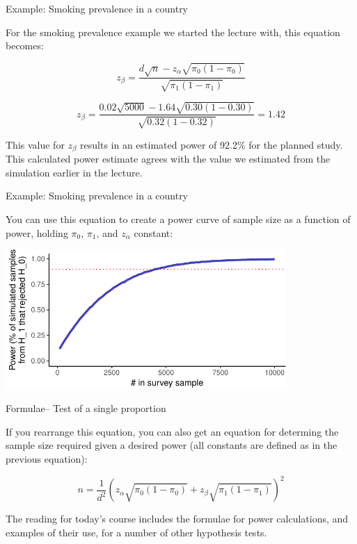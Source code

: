 \documentclass[ignorenonframetext,]{beamer}
\begin{document}
\begin{frame}{Example: Smoking prevalence in a country}

For the smoking prevalence example we started the lecture with, this
equation becomes:

\[
z_{\beta} = \frac{d\sqrt{n}-z_{\alpha}\sqrt{\pi_0(1-\pi_0)}}{\sqrt{\pi_1(1 - \pi_1)}}
\]

\[
z_{\beta} = \frac{0.02\sqrt{5000}-1.64\sqrt{0.30(1-0.30)}}{\sqrt{0.32(1 - 0.32)}} = 1.42
\]

This value for \(z_{\beta}\) results in an estimated power of 92.2\% for
the planned study. This calculated power estimate agrees with the value
we estimated from the simulation earlier in the lecture.

\end{frame}

\begin{frame}{Example: Smoking prevalence in a country}

You can use this equation to create a power curve of sample size as a
function of power, holding \(\pi_0\), \(\pi_1\), and \(z_{\alpha}\)
constant:

\begin{center}\includegraphics[width=0.8\textwidth]{sample_size_files/figure-beamer/unnamed-chunk-11-1} \end{center}

\end{frame}

\begin{frame}{Formulae-- Test of a single proportion}

If you rearrange this equation, you can also get an equation for
determing the sample size required given a desired power (all constants
are defined as in the previous equation):

\[
n = \frac{1}{d^2}\left(z_{\alpha}\sqrt{\pi_0(1-\pi_0)} + z_{\beta}\sqrt{\pi_1(1-\pi_1)}\right)^2
\]

The reading for today's course includes the formulae for power
calculations, and examples of their use, for a number of other
hypothesis tests.

\end{frame}
\end{document}
